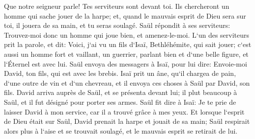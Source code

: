 \verse Que notre seigneur parle! Tes serviteurs sont devant toi. Ils chercheront un homme qui sache jouer de la harpe; et, quand le mauvais esprit de Dieu sera sur toi, il jouera de sa main, et tu seras soulagé. 
\verse Saül répondit à ses serviteurs: Trouvez-moi donc un homme qui joue bien, et amenez-le-moi. 
\verse L`un des serviteurs prit la parole, et dit: Voici, j`ai vu un fils d`Isaï, Bethléhémite, qui sait jouer; c`est aussi un homme fort et vaillant, un guerrier, parlant bien et d`une belle figure, et l`Éternel est avec lui. 
\verse Saül envoya des messagers à Isaï, pour lui dire: Envoie-moi David, ton fils, qui est avec les brebis. 
\verse Isaï prit un âne, qu`il chargea de pain, d`une outre de vin et d`un chevreau, et il envoya ces choses à Saül par David, son fils. 
\verse David arriva auprès de Saül, et se présenta devant lui; il plut beaucoup à Saül, et il fut désigné pour porter ses armes. 
\verse Saül fit dire à Isaï: Je te prie de laisser David à mon service, car il a trouvé grâce à mes yeux. 
\verse Et lorsque l`esprit de Dieu était sur Saül, David prenait la harpe et jouait de sa main; Saül respirait alors plus à l`aise et se trouvait soulagé, et le mauvais esprit se retirait de lui. 

\chapter{}

